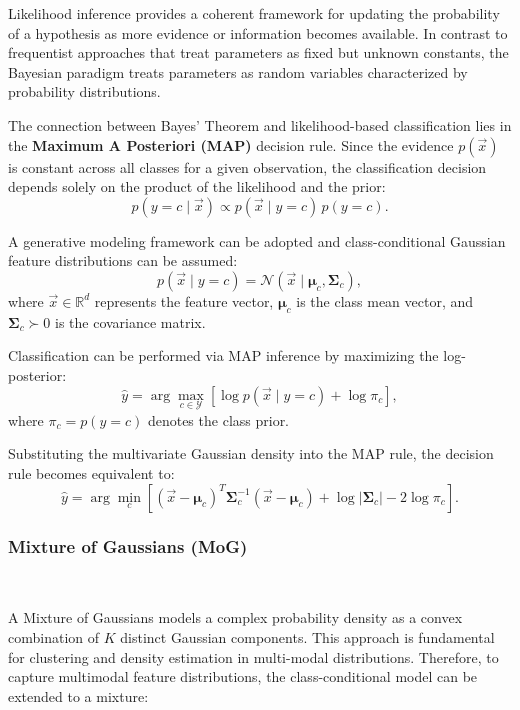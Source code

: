 Likelihood inference provides a coherent framework for updating the probability of a hypothesis as more evidence or information becomes available. In contrast to frequentist approaches that treat parameters as fixed but unknown constants, the Bayesian paradigm treats parameters as random variables characterized by probability distributions.

The connection between Bayes' Theorem and likelihood-based classification lies in the \textbf{Maximum A Posteriori (MAP)} decision rule. Since the evidence $p(\vec{x})$ is constant across all classes for a given observation, the classification decision depends solely on the product of the likelihood and the prior:
\begin{equation}
	p(y=c \mid \vec{x}) \propto p(\vec{x} \mid y=c) \, p(y=c).
\end{equation}

A generative modeling framework can be adopted and class-conditional Gaussian feature distributions can be assumed:
\begin{equation}
	p(\vec{x} \mid y=c)
	=
	\mathcal{N}(\vec{x} \mid \boldsymbol{\mu}_c, \boldsymbol{\Sigma}_c),
\end{equation}
where $\vec{x} \in \mathbb{R}^d$ represents the feature vector, $\boldsymbol{\mu}_c$ is the class mean vector, and $\boldsymbol{\Sigma}_c \succ 0$ is the covariance matrix.

Classification can be performed via MAP inference by maximizing the log-posterior:
\begin{equation}
	\hat{y}
	=
	\arg\max_{c \in \mathcal{Y}}
	\left[
	\log p(\vec{x} \mid y=c) + \log \pi_c
	\right],
\end{equation}
where $\pi_c = p(y=c)$ denotes the class prior.

Substituting the multivariate Gaussian density into the MAP rule, the decision rule becomes equivalent to:
\begin{equation}
	\hat{y}
	=
	\arg\min_{c}
	\left[
	(\vec{x}-\boldsymbol{\mu}_c)^T
	\boldsymbol{\Sigma}_c^{-1}
	(\vec{x}-\boldsymbol{\mu}_c)
	+
	\log |\boldsymbol{\Sigma}_c|
	-
	2\log \pi_c
	\right].
\end{equation}

\subsubsection{Mixture of Gaussians (MoG)} 

A Mixture of Gaussians models a complex probability density as a convex combination of $K$ distinct Gaussian components. This approach is fundamental for clustering and density estimation in multi-modal distributions. Therefore, to capture multimodal feature distributions, the class-conditional model can be extended to a mixture:

